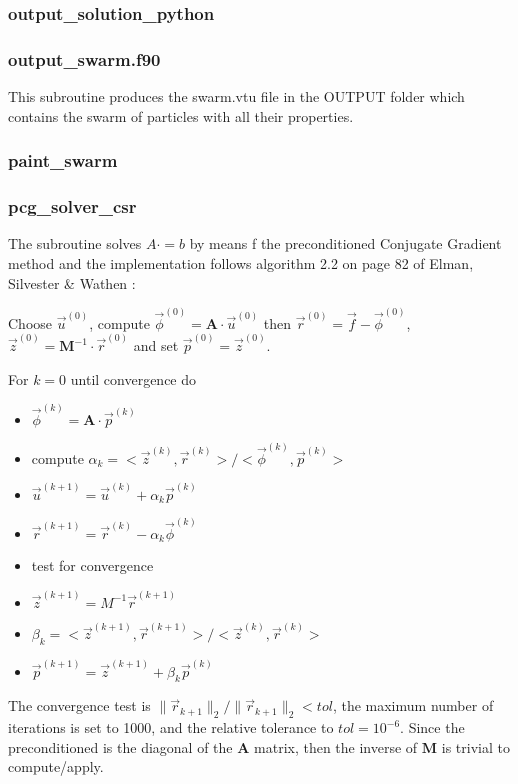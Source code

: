  \subsubsection{output\_solution\_python}

 \subsubsection{output\_swarm.f90}
 This subroutine produces the {\filenamefont swarm.vtu} file in the 
 {\foldernamefont OUTPUT} folder which contains the 
 swarm of particles with all their properties.
 \subsubsection{paint\_swarm}
 
 \subsubsection{pcg\_solver\_csr}
 The subroutine solves $A\cdot = b$ by means f the preconditioned Conjugate Gradient method
 and the implementation follows algorithm 2.2 on page 82 of Elman, Silvester \&
 Wathen \cite{elsw}:
 
 Choose ${\vec u}^{(0)}$, compute ${\vec \phi}^{(0)}={\bm A}\cdot {\vec u}^{(0)}$ 
 then ${\vec r}^{(0)}={\vec f}-{\vec \phi}^{(0)}$, 
 ${\vec z}^{(0)}={\bm M}^{-1}\cdot {\vec r}^{(0)}$ and set ${\vec p}^{(0)}={\vec z}^{(0)}$.
 
 For $k=0$ until convergence do
 \begin{itemize}
 \item ${\vec \phi}^{(k)}={\bm A}\cdot {\vec p}^{(k)}$
 \item compute $\alpha_k = <{\vec z}^{(k)},{\vec r}^{(k)}>/<{\vec \phi}^{(k)},{\vec p}^{(k)}>$
 \item ${\vec u}^{(k+1)}={\vec u}^{(k)}+\alpha_k {\vec p}^{(k)}$
 \item ${\vec r}^{(k+1)}={\vec r}^{(k)}-\alpha_k{\vec \phi}^{(k)}$
 \item test for convergence
 \item ${\vec z}^{(k+1)}=M^{-1} {\vec r}^{(k+1)}$
 \item $\beta_k= <{\vec z}^{(k+1)},{\vec r}^{(k+1)}>/<{\vec z}^{(k)},{\vec r}^{(k)}>$
 \item ${\vec p}^{(k+1)}={\vec z}^{(k+1)}+\beta_k {\vec p}^{(k)}$
 \end{itemize}
 The convergence test is $\| \vec{r}_{k+1} \|_2/ \| \vec{r}_{k+1} \|_2 < tol$, 
 the maximum number of iterations is set to 1000, and the relative tolerance to $tol=10^{-6}$.
 Since the preconditioned is the diagonal of the ${\bm A}$ matrix, then the inverse of 
 ${\bm M}$ is trivial to compute/apply. 
